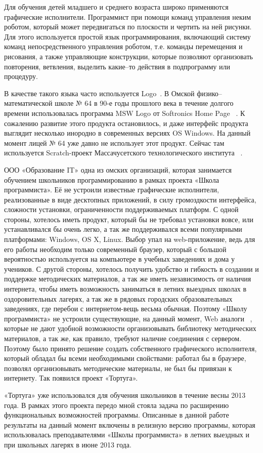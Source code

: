 Для обучения детей младшего и среднего возраста широко применяются графические исполнители. Программист при помощи команд управления неким роботом, который может передвигаться по плоскости и чертить на ней рисунки. Для этого используется простой язык программирования, включающий систему команд непосредственного управления роботом, т.е. команды перемещения и рисования, а также управляющие конструкции, которые позволяют организовать повторения, ветвления, выделить какие–то действия в подпрограмму или процедуру.\par
В качестве такого языка часто используется Logo~\cite{shaposhnicow}. В Омской физико–математической школе № 64 в 90-е годы прошлого века в течение долгого времени использовалась программа MSW Logo от Softronics Home Page ~\cite{logo}. К сожалению развитие этого продукта остановилось, и даже интерфейс продукта выглядит несколько инородно в современных версиях OS Windows. На данный момент лицей № 64 уже давно не использует этот продукт. Сейчас там используется Scratch-проект Массачусетского технологического института ~\cite{scratch}.\par
ООО «Образование IT» одна из омских организаций, которая занимается обучением школьников программированию в рамках проекта «Школа программиста». Её не устроили известные графические исполнители, реализованные в виде десктопных приложений, в силу громоздкости интерфейса, сложности установки, ограниченности поддерживаемых платформ. С одной стороны, хотелось иметь продукт, который бы не требовал установки вовсе, или устанавливался бы очень легко, а так же поддерживался всеми популярными платформами: Windows, OS X, Linux. Выбор упал на web-приложение, ведь для его работы необходим только современный браузер, который с большой вероятностью используется на компьютере в учебных заведениях и дома у учеников. С другой стороны, хотелось получить удобство и гибкость в создании и поддержке методических материалов, а так же иметь независимость от наличия интернета, чтобы иметь возможность заниматься в летних выездных школах в оздоровительных лагерях, а так же в рядовых городских образовательных заведениях, где перебои с интернетом-вещь весьма обычная. Поэтому «Школу программиста» не устроили существующие, на данный момент, Web аналоги ~\cite{blockly,codecademy,kodu,appinventor,alice,onlibelogo,logointerpr,logotortoise,tortuelogo,papert,}, которые не дают удобной возможности организовывать библиотеку методических материалов, а так же, как правило, требуют наличие соединения с сервером. Поэтому было принято решение создать собственного графического исполнителя, который обладал бы всеми необходимыми свойствами: работал бы в браузере, позволял организовывать методические материалы, не был бы привязан к интернету. Так появился проект «Тортуга».\par
«Тортуга» уже использовался для обучения школьников в течение весны 2013 года. В рамках этого проекта передо мной стояла задача по расширению функциональных возможностей программы. Описанные в данной работе результаты на данный момент включены в релизную версию программы, которая использовалась преподавателями «Школы программиста» в летних выездных и при школьных лагерях в июне 2013 года.


\clearpage